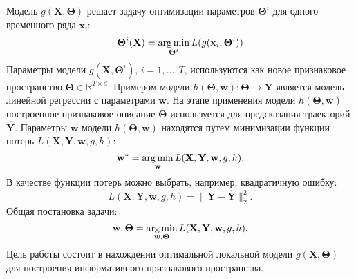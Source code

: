 \documentclass[12pt,twoside]{article}
\begin{document}
Модель $g(\mathbf{X}, \mathbf{\Theta})$ решает задачу оптимизации параметров $\mathbf{\Theta}^{i}$ для одного временного ряда $\mathbf{x_{i}}$:
\begin{equation}
\mathbf{\Theta}^i(\mathbf{X}) = \argmin_{\mathbf{\Theta}^i} L(g(\mathbf{x}_i, \mathbf{\Theta}^i))
\end{equation}
Параметры модели $g(\mathbf{X}, \mathbf{\Theta}^i)$, $i = 1,\dots,T$, используются как новое признаковое пространство $\mathbf{\Theta}\in\mathbb{R}^{T\times d}$.
Примером модели $h(\mathbf{\Theta}, \mathbf{w}): \mathbf{\Theta}\to\mathbf{Y}$ является модель линейной регрессии с параметрами $\mathbf{w}$. На этапе применения модели $h(\mathbf{\Theta}, \mathbf{w})$ построенное признаковое описание $\mathbf{\Theta}$ используется для предсказания траекторий $\mathbf{\hat{Y}}$.
Параметры $\mathbf{w}$ модели $h(\mathbf{\Theta}, \mathbf{w})$ находятся путем минимизации функции потерь $L(\mathbf{X}, \mathbf{Y}, \mathbf{w}, g, h)$:
\begin{equation}
\mathbf{w^*} = \argmin_{\mathbf{w}} L(\mathbf{X}, \mathbf{Y}, \mathbf{w}, g, h).
\end{equation}
В качестве функции потерь можно выбрать, например, квадратичную ошибку:
\begin{equation}
L(\mathbf{X}, \mathbf{Y}, \mathbf{w}, g, h) = \|\mathbf{Y}-\mathbf{\hat{Y}}\|^2_2.
\end{equation}
Общая постановка задачи:
\begin{equation}
\mathbf{w}, \mathbf{\Theta} = \argmin_{\mathbf{w}, \mathbf{\Theta}} L(\mathbf{X}, \mathbf{Y}, \mathbf{w}, g, h).
\end{equation}
Цель работы состоит в нахождении оптимальной локальной модели $g(\mathbf{X}, \mathbf{\Theta})$ для построения информативного признакового пространства.
\end{document}
